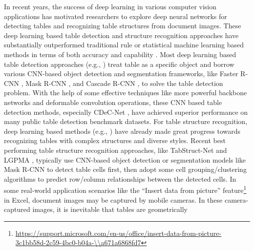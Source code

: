 \documentclass[final,3p,times,twocolumn]{elsarticle}
\begin{document}
In recent years, the success of deep learning in various computer vision applications has motivated researchers to explore deep neural networks for detecting tables and recognizing table structures from document images. These deep learning based table detection and structure recognition approaches have substantially outperformed traditional rule or statistical machine learning based methods in terms of both accuracy and capability \cite{hashmi2021current}. Most deep learning based table detection approaches (e.g., \cite{hao2016table,vo2018ensemble,gilani2017table,huang2019yolo,zheng2021global,saha2019graphical,prasad2020cascadetabnet,agarwal2021cdec}) treat table as a specific object and borrow various CNN-based object detection and segmentation frameworks, like Faster R-CNN \cite{ren2015faster}, Mask R-CNN \cite{he2017mask}, and Cascade R-CNN \cite{cai2019cascade}, to solve the table detection problem. With the help of some effective techniques like more powerful backbone networks and deformable convolution operations, these CNN based table detection methods, especially CDeC-Net \cite{agarwal2021cdec}, have achieved superior performance on many public table detection benchmark datasets. {} For table structure recognition, deep learning based methods (e.g., \cite{zheng2021global,schreiber2017deepdesrt,siddiqui2019rethinking,tensmeyer2019deep,khan2019table,siddiqui2019deeptabstr,hashmi2021guided,qasim2019rethinking,raja2020table,qiao2021lgpma,li2021adaptive}) have already made great progress towards recognizing tables with complex structures and diverse styles. Recent best performing table structure recognition approaches, like TabStruct-Net \cite{raja2020table} and LGPMA \cite{qiao2021lgpma}, typically use CNN-based object detection or segmentation models like Mask R-CNN to detect table cells first, then adopt some cell grouping/clustering algorithms to predict row/column relationships between the detected cells. {} In some real-world application scenarios like the “Insert data from picture” feature\footnote{\url{https://support.microsoft.com/en-us/office/insert-data-from-picture-3c1bb58d-2c59-4bc0-b04a-\\a671a6868fd7}} in Excel, document images may be captured by mobile cameras. In these camera-captured images, it is inevitable that tables are geometrically 
\end{document}
